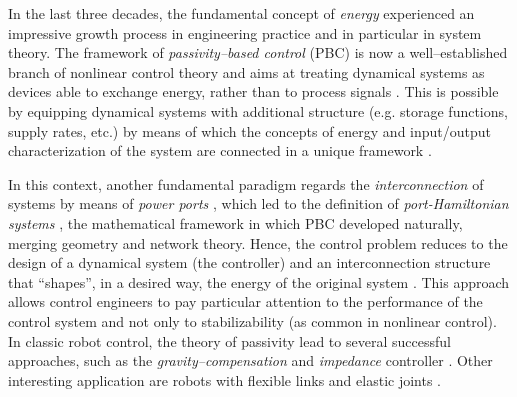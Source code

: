 %
In the last three decades, the fundamental concept of \textit{energy} experienced an impressive growth process in engineering practice and in particular in system theory. 
%
%
%
The framework of \textit{passivity--based control} (PBC) is now a well--established branch of nonlinear control theory and aims at treating dynamical systems as devices able to exchange energy, rather than to process signals \citep{ortega2001putting}. 
This is possible by equipping dynamical systems with additional structure (e.g. storage functions, supply rates, etc.) by means of which the concepts of energy and input/output characterization of the system are connected in a unique framework \citep{sontag2008input}.
%
\newline

%
In this context, another fundamental paradigm regards the \textit{interconnection} of systems by means of \textit{power ports} \citep{duindam2009modeling}, which led to the definition of \textit{port-Hamiltonian systems} \citep{MASCHKE1992359,ortega2001putting,van2014port}, the mathematical framework in which PBC developed naturally, merging geometry and network theory. Hence, the control problem reduces to the design of a dynamical system (the controller) and an interconnection structure that ``shapes'', in a desired way, the energy of the original system \citep{ortega2001putting,ortega2008control}.
%
%
%
This approach allows control engineers to pay particular attention to the performance of the control system and not only to stabilizability (as common in nonlinear control).
%
%
%
In classic robot control, the theory of passivity lead to several successful approaches, such as the \textit{gravity--compensation} \citep{arimoto1984stability} and \textit{impedance} controller \citep{secchi2007control}. Other interesting application are robots with flexible links \citep{macchelli2009} and elastic joints \citep{zhang2016}.
%

